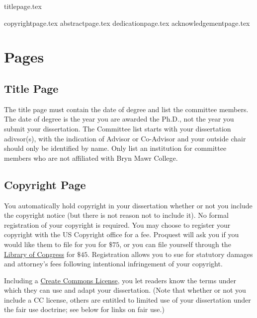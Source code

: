 \documentclass[12pt]{report}
\begin{document}
{titlepage.tex} %

{copyrightpage.tex}
{abstractpage.tex}
\setcounter{page}{2}
{dedicationpage.tex}
{acknowledgementpage.tex}
\tableofcontents
\newpage
\listoffigures
{}
\newpage
\listoftables
{}
\newpage
\listofappendices
\newpage
\chapter{Pages}
\section{Title Page}
The title page must contain the date of degree and list the committee members. The date of degree is the year you are awarded the Ph.D., not the year you submit your dissertation. The Committee list starts with your dissertation adivsor(s), with the indication of Advisor or Co-Advisor and your outside chair should only be identified by name. Only list an institution for committee members who are not affiliated with Bryn Mawr College.
\section{Copyright Page}
You automatically hold copyright in your dissertation whether or not you include the copyright notice (but there is not reason not to include it). No formal registration of your copyright is required. You may choose to register your copyright with the US Copyright office for a fee. Proquest will ask you if you would like them to file for you for $\$75$, or you can file yourself through the \href{https://www.copyright.gov/registration/}{Library of Congress} for $\$45$. Registration allows you to sue for statutory damages and attorney's fees following intentional infringement of your copyright.

Including a \href{https://creativecommons.org/licenses/}{Create Commons License}, you let readers know the terms under which they can use and adapt your dissertation. (Note that whether or not you include a CC license, others are entitled to limited use of your dissertation under the fair use doctrine; see below for links on fair use.)
\end{document}
